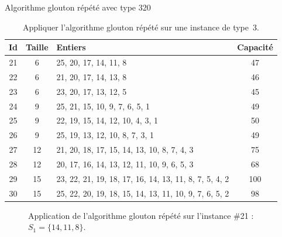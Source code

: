 \begin{exercice}[label=ex:MTGS3]{Algorithme glouton répété avec type 3}{20}

\begin{table}[H]
\centering
\begin{tabular}{cclc}
  \toprule
Id & Taille & Entiers & Capacité \\
  \midrule
 21 &   6 & 25, 20, 17, 14, 11, 8 &  47 \\
   22 &   6 & 21, 20, 17, 14, 13, 8 &  46 \\
   23 &   6 & 23, 20, 17, 13, 12, 5 &  45 \\
   24 &   9 & 25, 21, 15, 10, 9, 7, 6, 5, 1 &  49 \\
   25 &   9 & 22, 19, 15, 14, 12, 10, 4, 3, 1 &  50 \\
   26 &   9 & 25, 19, 13, 12, 10, 8, 7, 3, 1 &  49 \\
   27 &  12 & 21, 20, 18, 17, 15, 14, 13, 10, 8, 7, 4, 3 &  75 \\
   28 &  12 & 20, 17, 16, 14, 13, 12, 11, 10, 9, 6, 5, 3 &  68 \\
   29 &  15 & 23, 22, 21, 19, 18, 17, 16, 14, 13, 11, 8, 7, 5, 4, 2 & 100 \\
   30 &  15 & 25, 22, 20, 19, 18, 15, 14, 13, 11, 10, 9, 7, 6, 5, 2 &  98 \\
   \bottomrule
\end{tabular}
\caption{Appliquer l'algorithme glouton répété sur une instance de type~3.}
\label{tab:MTGS3}
\end{table}

\end{exercice}

\begin{figure}[htbp]
\centering
{}
\caption{Application de l'algorithme glouton répété sur l'instance \#21 : $S_1 = \{14,11,8\}$.}
\label{fig:MTGS3-21}
\end{figure}

\ifshowsols

